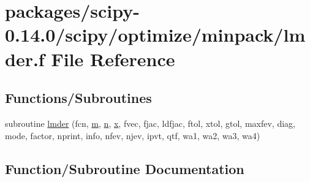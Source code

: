 \hypertarget{lmder_8f}{}\section{packages/scipy-\/0.14.0/scipy/optimize/minpack/lmder.f File Reference}
\label{lmder_8f}
\subsection*{Functions/\+Subroutines}
\begin{DoxyCompactItemize}
\item 
subroutine \hyperlink{lmder_8f_ac17d41a519a45488bb333f5248b7c37f}{lmder} (fcn, \hyperlink{indexexpr_8h_ab72fdb4031d47b75ab26dd18a437bcdc}{m}, \hyperlink{indexexpr_8h_ab427e2e2b4d6cec55fa088ea2a692ace}{n}, \hyperlink{vecnorm1_8cc_ac73eed9e41ec09d58f112f06c2d6cb63}{x}, fvec, fjac, ldfjac, ftol, xtol, gtol, maxfev, diag, mode, factor, nprint, info, nfev, njev, ipvt, qtf, wa1, wa2, wa3, wa4)
\end{DoxyCompactItemize}


\subsection{Function/\+Subroutine Documentation}
\hypertarget{lmder_8f_ac17d41a519a45488bb333f5248b7c37f}{}
